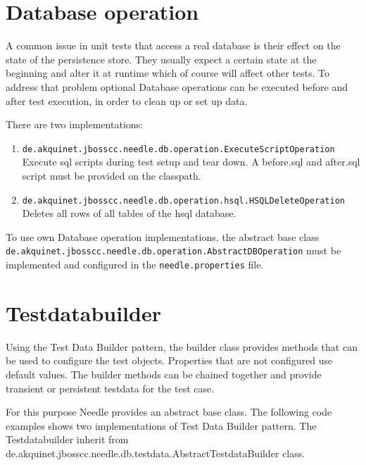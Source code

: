 \section{Database operation}

A common issue in unit tests that access a real database is their effect on the state of the persistence store.
They usually expect a certain state at the beginning and alter it at runtime which of course will affect other tests.
To address that problem optional Database operations can be executed before and after test execution, in order to clean up or set up data. 

There are two implementations:
\begin{enumerate}
\item \verb|de.akquinet.jbosscc.needle.db.operation.ExecuteScriptOperation| \\ Execute sql scripts during test setup and tear down. A before.sql and after.sql script must be provided on the classpath.
\item \verb|de.akquinet.jbosscc.needle.db.operation.hsql.HSQLDeleteOperation| \\ Deletes all rows of all tables of the hsql database.
\end{enumerate}

To use own Database operation implementations, the abstract base class \verb|de.akquinet.jbosscc.needle.db.operation.AbstractDBOperation| must be implemented and configured in the \verb|needle.properties| file.

\section{Testdatabuilder}

Using the Test Data Builder pattern, the builder class provides methods that can be used to configure the test objects. 
Properties that are not configured use default values. The builder methods can be chained together and provide transient or persistent testdata for the test case.

For this purpose Needle provides an abstract base class. The following code examples shows two implementations of Test Data Builder pattern. The Testdatabuilder inherit from 
de.akquinet.jbosscc.needle.db.testdata.\-AbstractTestdataBuilder class. 

